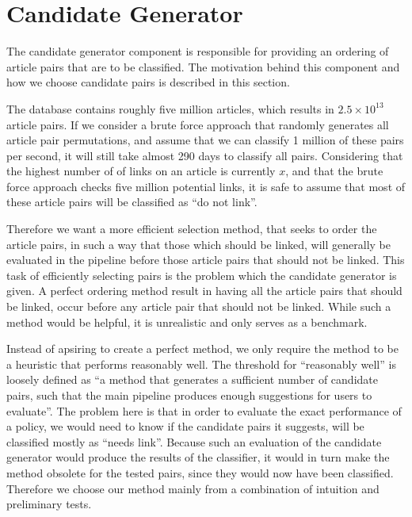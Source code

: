 \section{Candidate Generator}
The candidate generator component is responsible for providing an ordering of article pairs that are to be classified. The motivation behind this component and how we choose candidate pairs is described in this section.


The database contains roughly five million articles, which results in $2.5 \times 10^{13}$ article pairs. If we consider a brute force approach that randomly generates all article pair permutations, and assume that we can classify 1 million of these pairs per second, it will still take almost 290 days to classify all pairs. Considering that the highest number of of links on an article is currently $x$, and that the brute force approach checks five million potential links, it is safe to assume that most of these article pairs will be classified as \enquote{do not link}.

Therefore we want a more efficient selection method, that seeks to order the article pairs, in such a way that those which should be linked, will generally be evaluated in the pipeline before those article pairs that should not be linked. This task of efficiently selecting pairs is the problem which the candidate generator is given. A perfect ordering method result in having all the article pairs that should be linked, occur before any article pair that should not be linked. While such a method would be helpful, it is unrealistic and only serves as a benchmark. 

Instead of apsiring to create a perfect method, we only require the method to be a heuristic that performs reasonably well. The threshold for \enquote{reasonably well} is loosely defined as \enquote{a method that generates a sufficient number of candidate pairs, such that the main pipeline produces enough suggestions for users to evaluate}. The problem here is that in order to evaluate the exact performance of a policy, we would need to know if the candidate pairs it suggests, will be classified mostly as \enquote{needs link}. Because such an evaluation of the candidate generator would produce the results of the classifier, it would in turn make the method obsolete for the tested pairs, since they would now have been classified. Therefore we choose our method mainly from a combination of intuition and preliminary tests.

